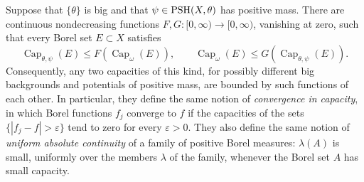 \begin{theorem}\label{thm:global-relative-capacity-comparison}
Suppose that $\{\theta\}$ is big and that $\psi\in\mathrm{PSH}(X,\theta)$ has positive mass. There are continuous nondecreasing functions $F,G\colon[0,\infty)\to[0,\infty)$, vanishing at zero, such that every Borel set $E\subset X$ satisfies
\[
 \operatorname{Cap}_{\theta,\psi}(E)\leq F(\operatorname{Cap}_\omega(E)),
 \qquad \operatorname{Cap}_\omega(E)\leq G(\operatorname{Cap}_{\theta,\psi}(E)).
\]
Consequently, any two capacities of this kind, for possibly different big backgrounds and potentials of positive mass, are bounded by such functions of each other. In particular, they define the same notion of \emph{convergence in capacity}, in which Borel functions $f_j$ converge to $f$ if the capacities of the sets $\{|f_j-f|>\varepsilon\}$ tend to zero for every $\varepsilon>0$. They also define the same notion of \emph{uniform absolute continuity} of a family of positive Borel measures: $\lambda(A)$ is small, uniformly over the members $\lambda$ of the family, whenever the Borel set $A$ has small capacity.
\end{theorem}
